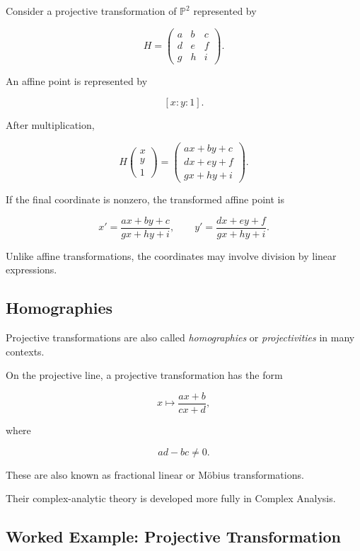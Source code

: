 Consider a projective transformation of \(\mathbb{P}^{2}\) represented by

\[
H=
\begin{pmatrix}
a&b&c\\
d&e&f\\
g&h&i
\end{pmatrix}.
\]

An affine point is represented by

\[
[x:y:1].
\]

After multiplication,

\[
H
\begin{pmatrix}
x\\y\\1
\end{pmatrix}
=
\begin{pmatrix}
ax+by+c\\
dx+ey+f\\
gx+hy+i
\end{pmatrix}.
\]

If the final coordinate is nonzero, the transformed affine point is

\[
\boxed{
x'
=
\frac{ax+by+c}{gx+hy+i},
\qquad
y'
=
\frac{dx+ey+f}{gx+hy+i}.
}
\]

Unlike affine transformations, the coordinates may involve division by
linear expressions.

\subsection{Homographies}
\label{subsec:homographies}

Projective transformations are also called \emph{homographies} or
\emph{projectivities} in many contexts.

On the projective line, a projective transformation has the form

\[
\boxed{
x\longmapsto\frac{ax+b}{cx+d},
}
\]

where

\[
ad-bc\neq0.
\]

These are also known as fractional linear or Möbius transformations.

Their complex-analytic theory is developed more fully in Complex Analysis.

\subsection{Worked Example: Projective Transformation}
\label{subsec:worked-projective-transformation}

